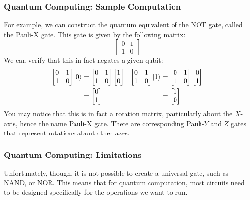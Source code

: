 \documentclass{beamer}
\renewcommand{\ket}{\Ket}
\renewcommand{\ket}{\Ket}
\begin{document}
\begin{frame}
\frametitle{Quantum Computing: Sample Computation}
        For example, we can construct the quantum equivalent of the NOT gate, called the Pauli-X gate. 
        This gate is given by the following matrix:
            $$\begin{bmatrix} 0 & 1 \\ 1 & 0 \end{bmatrix}$$
        We can verify that this in fact negates a given qubit:
        \begin{align*}
            \begin{bmatrix} 0 & 1 \\ 1 & 0 \end{bmatrix} \ket{0} &= \begin{bmatrix} 0 & 1 \\ 1 & 0 \end{bmatrix} \begin{bmatrix} 1 \\ 0 \end{bmatrix}& \begin{bmatrix} 0 & 1 \\ 1 & 0 \end{bmatrix} \ket{1} &= \begin{bmatrix} 0 & 1 \\ 1 & 0 \end{bmatrix} \begin{bmatrix} 0 \\ 1 \end{bmatrix}\\
            &= \begin{bmatrix} 0 \\ 1 \end{bmatrix} & &= \begin{bmatrix} 1 \\ 0 \end{bmatrix}
        \end{align*}
        You may notice that this is in fact a rotation matrix, particularly about the $X$-axis, hence the name Pauli-X gate.
        There are corresponding Pauli-$Y$ and $Z$ gates that represent rotations about other axes.
\end{frame}

\begin{frame}
\frametitle{Quantum Computing: Limitations}
        Unfortunately, though, it is not possible to create a universal gate, such as NAND, or NOR.
        This means that for quantum computation, most circuits need to be designed specifically for the operations we want to run.
\end{frame}
\end{document}
